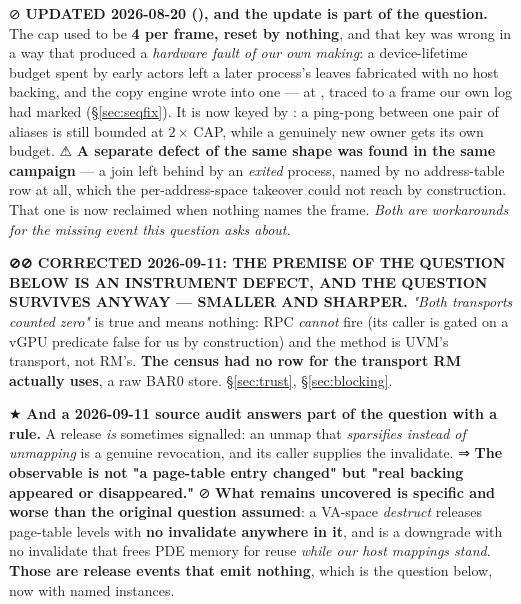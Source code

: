 \documentclass[10.5pt]{article}
\begin{document}
\smallskip
⊘ \textbf{UPDATED 2026-08-20 (), and the update is part of the question.} The cap
used to be \textbf{4 per frame, reset by nothing}, and that key was wrong in a way that produced a
\emph{hardware fault of our own making}: a device-lifetime budget spent by early actors left a
later process's leaves fabricated with no host backing, and the copy engine wrote into one ---
 at , traced to a frame our own log had marked
 (\S\ref{sec:seqfix}). It is now keyed by : a ping-pong
between one pair of aliases is still bounded at $2\times$\,CAP, while a genuinely new owner gets
its own budget. ⚠ \textbf{A separate defect of the same shape was found in the same campaign} ---
a join left behind by an \emph{exited} process, named by no address-table row at all, which the
per-address-space takeover could not reach by construction. That one is now reclaimed when nothing
names the frame. \emph{Both are workarounds for the missing event this question asks about.}

\begin{warnbox}\small
\textbf{⊘⊘ CORRECTED 2026-09-11: THE PREMISE OF THE QUESTION BELOW IS AN INSTRUMENT DEFECT, AND
THE QUESTION SURVIVES ANYWAY --- SMALLER AND SHARPER.} \emph{"Both transports counted zero"} is
true and means nothing:  RPC  \emph{cannot} fire (its caller is
gated on a vGPU predicate false for us by construction) and the  method is UVM's
transport, not RM's. \textbf{The census had no row for the transport RM actually uses}, a raw BAR0
store. \S\ref{sec:trust}, \S\ref{sec:blocking}.

\smallskip
★ \textbf{And a 2026-09-11 source audit answers part of the question with a rule.} A release
\emph{is} sometimes signalled: an unmap that \emph{sparsifies instead of unmapping} is a genuine
revocation, and its caller supplies the invalidate. ⇒ \textbf{The observable is not "a page-table
entry changed" but "real backing appeared or disappeared."} ⊘ \textbf{What remains uncovered is
specific and worse than the original question assumed}: a VA-space \emph{destruct} releases
page-table levels with \textbf{no invalidate anywhere in it}, and
 is a downgrade with no invalidate that frees PDE memory for reuse
\emph{while our host mappings stand}. \textbf{Those are release events that emit nothing}, which
is the question below, now with named instances.
\end{warnbox}
\end{document}
